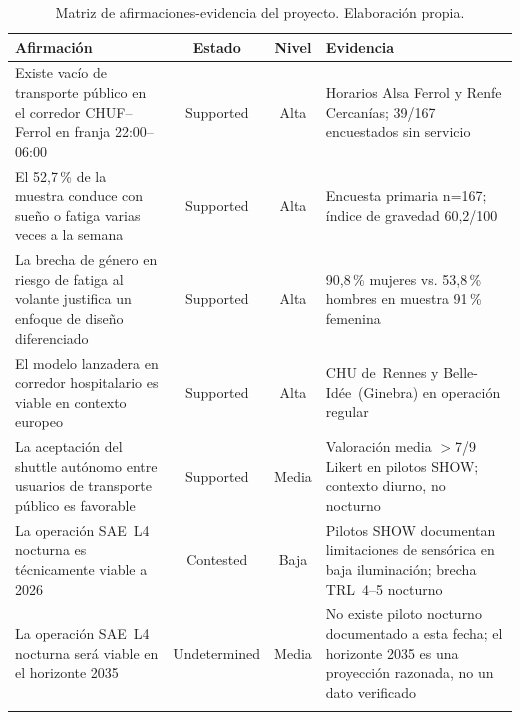 \begin{table}[htbp]
\centering
\caption{Matriz de afirmaciones-evidencia del proyecto.
  Elaboración propia.}
\label{tab:matriz-evidencia}
\small
\begin{tabularx}{\textwidth}{p{5.2cm} c c p{4.8cm}}
\toprule
\textbf{Afirmación} &
\textbf{Estado} &
\textbf{Nivel} &
\textbf{Evidencia} \\
\midrule

Existe vacío de transporte público en el corredor
\acs{CHUF}--Ferrol en franja 22:00--06:00 &
Supported & Alta &
Horarios Alsa Ferrol y Renfe Cercanías;
39/167 encuestados sin servicio
\parencite{Alsaferrol2024horarios,
RenfeCercaniasFerrol2026,
LouridoRegueira2026} \\
\addlinespace

El 52,7\,\% de la muestra conduce con sueño o fatiga
varias veces a la semana &
Supported & Alta &
Encuesta primaria n=167; índice de gravedad
60,2/100~\parencite{LouridoRegueira2026} \\
\addlinespace

La brecha de género en riesgo de fatiga al volante
justifica un enfoque de diseño diferenciado &
Supported & Alta &
90,8\,\% mujeres vs. 53,8\,\% hombres en muestra
91\,\% femenina~\parencite{LouridoRegueira2026} \\
\addlinespace

El modelo lanzadera en corredor hospitalario es viable
en contexto europeo &
Supported & Alta &
\acs{CHU} de~Rennes y Belle-Idée~(Ginebra) en operación
regular~\parencite{SHOW2024Legacy,AVENUE2023} \\
\addlinespace

La aceptación del shuttle autónomo entre usuarios de
transporte público es favorable &
Supported & Media &
Valoración media $>$7/9 Likert en pilotos SHOW; contexto
diurno, no nocturno~\parencite{SHOW2024Legacy} \\
\addlinespace

La operación \acs{SAE}~L4 nocturna es técnicamente viable
a 2026 &
Contested & Baja &
Pilotos SHOW documentan limitaciones de sensórica en baja
iluminación; brecha TRL~4--5 nocturno~\parencite{SHOW2024Legacy} \\
\addlinespace

La operación \acs{SAE}~L4 nocturna será viable en el
horizonte 2035 &
Undetermined & Media &
No existe piloto nocturno documentado a esta fecha; el
horizonte 2035 es una proyección razonada, no un dato
verificado~\parencite{KonstantasAVENUE2023lessons} \\
\addlinespace


\end{tabularx}
\end{table}
